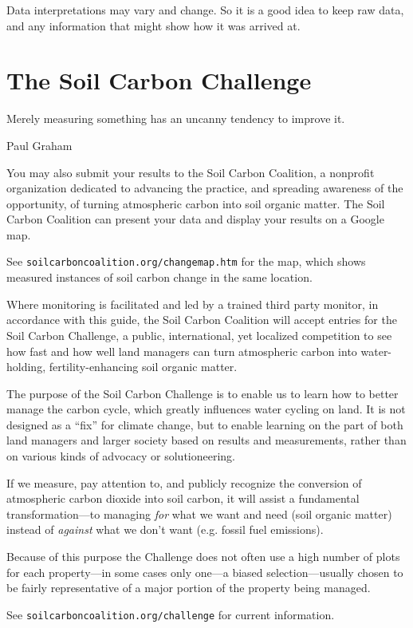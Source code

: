 \documentclass[11pt,letterpaper,oneside,onecolumn]{memoir}
\begin{document}
Data interpretations may vary and change. So it is a good idea to keep raw data, and any information that might show how it was arrived at.


\section{The Soil Carbon Challenge\label{challenge}}

\epigraph{Merely measuring something has an uncanny tendency to improve it.}{Paul Graham}

\noindent You may also submit your results to the Soil Carbon Coalition, a nonprofit organization dedicated to advancing the practice, and spreading awareness of the opportunity, of turning atmospheric carbon into soil organic matter. The Soil Carbon Coalition can present your data and display your results on a Google map.

See \texttt{soilcarboncoalition.org/changemap.htm} for the map, which shows measured instances of soil carbon change in the same location.

Where monitoring is facilitated and led by a trained third party monitor, in accordance with this guide, the Soil Carbon Coalition will accept entries for the Soil Carbon Challenge, a public, international, yet localized competition to see how fast and how well land managers can turn atmospheric carbon into water-holding, fertility-enhancing soil organic matter.

The purpose of the Soil Carbon Challenge is to enable us to learn how to better manage the carbon cycle, which greatly influences water cycling on land. It is not designed as a ``fix'' for climate change, but to enable learning on the part of both land managers and larger society based on results and measurements, rather than on various kinds of advocacy or solutioneering.

If we measure, pay attention to, and publicly recognize the conversion of atmospheric carbon dioxide into soil carbon, it will assist a fundamental transformation---to managing \emph{for} what we want and need (soil organic matter) instead of \emph{against} what we don't want (e.g. fossil fuel emissions).

Because of this purpose the Challenge does not often use a high number of plots for each property---in some cases only one---a biased selection---usually chosen to be fairly representative of a major portion of the property being managed.

See \texttt{soilcarboncoalition.org/challenge} for current information.
\end{document}
